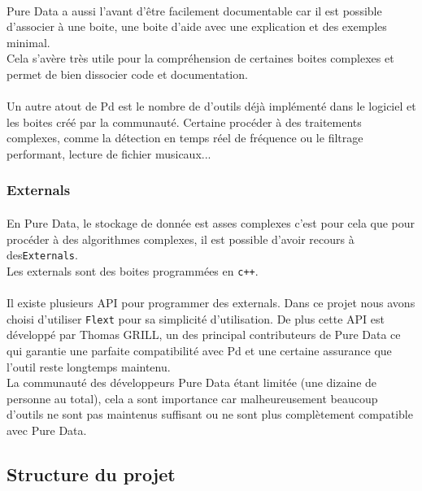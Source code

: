 \documentclass[a4paper, titlepage, oneside, 12pt]{article}%
\begin{document}
\paragraph{}
Pure Data a aussi l'avant d'être facilement documentable car il est possible d'associer à une boite, une boite d'aide avec une explication et des exemples minimal.\\
Cela s’avère très utile pour la compréhension de certaines boites complexes et permet de bien dissocier code et documentation.
\paragraph{}
Un autre atout de Pd est le nombre de d'outils déjà implémenté dans le logiciel et les boites créé par la communauté. Certaine procéder à des traitements complexes, comme la détection en temps réel de fréquence ou le filtrage performant, lecture de fichier musicaux...

\subsubsection{Externals}
\paragraph{}
En Pure Data, le stockage de donnée est asses complexes c'est pour cela que pour procéder à des algorithmes complexes, il est possible d'avoir recours à des\texttt{Externals}.\\
Les externals sont des boites programmées en \texttt{c++}. 

\paragraph{}
Il existe plusieurs API pour programmer des externals. Dans ce projet nous avons choisi d'utiliser \texttt{Flext} pour sa simplicité d'utilisation. De plus cette API est développé par Thomas GRILL, un des principal contributeurs de Pure Data ce qui garantie une parfaite compatibilité avec Pd et une certaine assurance que l’outil reste longtemps maintenu. \\
La communauté des développeurs Pure Data étant limitée (une dizaine de personne au total), cela a sont importance car malheureusement beaucoup d'outils ne sont pas maintenus suffisant ou ne sont plus complètement compatible avec Pure Data.  

\subsection{Structure du projet}
\end{document}
